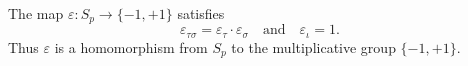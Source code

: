 The map $\varepsilon: S_p \to \{-1, +1\}$ satisfies
$$\varepsilon_{\tau \sigma} = \varepsilon_\tau \cdot \varepsilon_\sigma \quad \text{and} \quad \varepsilon_\iota = 1.$$
Thus $\varepsilon$ is a homomorphism from $S_p$ to the multiplicative group $\{-1, +1\}$.
